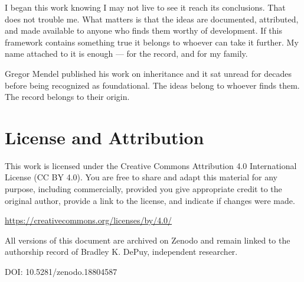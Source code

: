 \documentclass[11pt]{article}
\begin{document}
I began this work knowing I may not live to see it reach its conclusions. That
does not trouble me. What matters is that the ideas are documented, attributed,
and made available to anyone who finds them worthy of development. If this
framework contains something true it belongs to whoever can take it further.
My name attached to it is enough — for the record, and for my family.

Gregor Mendel published his work on inheritance and it sat unread for decades
before being recognized as foundational. The ideas belong to whoever finds them.
The record belongs to their origin.
\section{License and Attribution}
\label{sec:org1ace46f}

This work is licensed under the Creative Commons Attribution 4.0 International
License (CC BY 4.0). You are free to share and adapt this material for any
purpose, including commercially, provided you give appropriate credit to the
original author, provide a link to the license, and indicate if changes were made.

\url{https://creativecommons.org/licenses/by/4.0/}

All versions of this document are archived on Zenodo and remain linked to the
authorship record of Bradley K. DePuy, independent researcher.

DOI: 10.5281/zenodo.18804587
\end{document}
